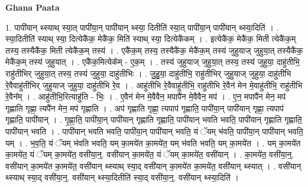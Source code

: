 \documentclass[17pt]{extarticle}
\begin{document}
\textbf{Ghana Paata } \newline

1. पापी॑यान् थ्स्याथ् स्या॒त् पापी॑या॒न् पापी॑यान् थ्स्या॒ दितीति॑ स्या॒त् पापी॑या॒न् पापी॑यान् थ्स्या॒दिति॑ । . स्या॒दितीति॑ स्याथ् स्या॒ दित्येकै॑क॒ मेकै॑क॒ मिति॑ स्याथ् स्या॒ दित्येकै॑कम् । . इत्येकै॑क॒ मेकै॑क॒ मिती त्येकै॑क॒म् तस्य॒ तस्यैकै॑क॒ मिती त्येकै॑क॒म् तस्य॑ । . एकै॑क॒म् तस्य॒ तस्यैकै॑क॒ मेकै॑क॒म् तस्य॑ जुहुयाज् जुहुया॒त् तस्यैकै॑क॒ मेकै॑क॒म् तस्य॑ जुहुयात् । . एकै॑क॒मित्येक᳚म् - ए॒क॒म् । . तस्य॑ जुहुयाज् जुहुया॒त् तस्य॒ तस्य॑ जुहुया॒ दाहु॑तीभि॒ राहु॑तीभिर् जुहुया॒त् तस्य॒ तस्य॑ जुहुया॒ दाहु॑तीभिः । . जु॒हु॒या॒ दाहु॑तीभि॒ राहु॑तीभिर् जुहुयाज् जुहुया॒ दाहु॑तीभि रे॒वैवाहु॑तीभिर् जुहुयाज् जुहुया॒ दाहु॑तीभि रे॒व । . आहु॑तीभि रे॒वैवाहु॑तीभि॒ राहु॑तीभि रे॒वैन॑ मेन मे॒वाहु॑तीभि॒ राहु॑तीभि रे॒वैन᳚म् । . आहु॑तीभि॒रित्याहु॑ति - भिः॒ । . ए॒वैन॑ मेन मे॒वैवैन॒ मपापै॑न मे॒वैवैन॒ मप॑ । . ए॒न॒ मपापै॑न मेन॒ मप॑ गृह्णाति गृह्णा॒ त्यपै॑न मेन॒ मप॑ गृह्णाति । . अप॑ गृह्णाति गृह्णा॒ त्यपाप॑ गृह्णाति॒ पापी॑या॒न् पापी॑यान् गृह्णा॒ त्यपाप॑ गृह्णाति॒ पापी॑यान् । . गृ॒ह्णा॒ति॒ पापी॑या॒न् पापी॑यान् गृह्णाति गृह्णाति॒ पापी॑यान् भवति भवति॒ पापी॑यान् गृह्णाति गृह्णाति॒ पापी॑यान् भवति । . पापी॑यान् भवति भवति॒ पापी॑या॒न् पापी॑यान् भवति॒ यं ॅयम् भ॑वति॒ पापी॑या॒न् पापी॑यान् भवति॒ यम् । . भ॒व॒ति॒ यं ॅयम् भ॑वति भवति॒ यम् का॒मये॑त का॒मये॑त॒ यम् भ॑वति भवति॒ यम् का॒मये॑त । . यम् का॒मये॑त का॒मये॑त॒ यं ॅयम् का॒मये॑त॒ वसी॑या॒न्॒. वसी॑यान् का॒मये॑त॒ यं ॅयम् का॒मये॑त॒ वसी॑यान् । . का॒मये॑त॒ वसी॑या॒न्॒. वसी॑यान् का॒मये॑त का॒मये॑त॒ वसी॑यान् थ्स्याथ् स्या॒द् वसी॑यान् का॒मये॑त का॒मये॑त॒ वसी॑यान् थ्स्यात् । . वसी॑यान् थ्स्याथ् स्या॒द् वसी॑या॒न्॒. वसी॑यान् थ्स्या॒दितीति॑ स्या॒द् वसी॑या॒न्॒. वसी॑यान् थ्स्या॒दिति॑ । \newline
\end{document}
